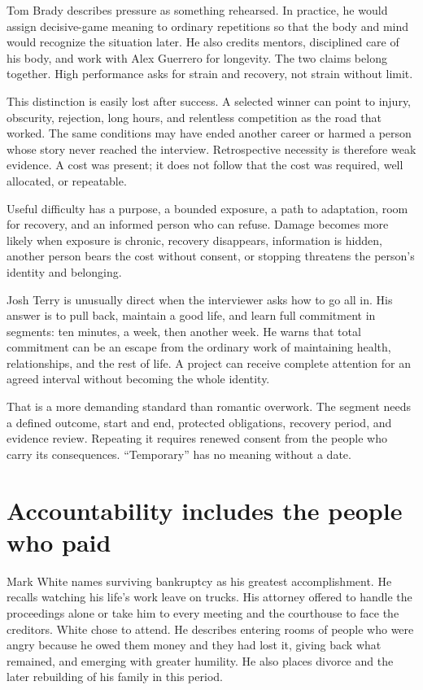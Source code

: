 Tom Brady describes pressure as something rehearsed. In practice, he would
assign decisive-game meaning to ordinary repetitions so that the body and mind
would recognize the situation later. He also credits mentors, disciplined
care of his body, and work with Alex Guerrero for longevity. The two claims
belong together. High performance asks for strain and recovery, not strain
without limit.

This distinction is easily lost after success. A selected winner can point to
injury, obscurity, rejection, long hours, and relentless competition as the
road that worked. The same conditions may have ended another career or harmed
a person whose story never reached the interview. Retrospective necessity is
therefore weak evidence. A cost was present; it does not follow that the cost
was required, well allocated, or repeatable.

Useful difficulty has a purpose, a bounded exposure, a path to adaptation,
room for recovery, and an informed person who can refuse. Damage becomes more
likely when exposure is chronic, recovery disappears, information is hidden,
another person bears the cost without consent, or stopping threatens the
person's identity and belonging.

Josh Terry is unusually direct when the interviewer asks how to go all in. His
answer is to pull back, maintain a good life, and learn full commitment in
segments: ten minutes, a week, then another week. He warns that total
commitment can be an escape from the ordinary work of maintaining health,
relationships, and the rest of life. A project can receive complete attention
for an agreed interval without becoming the whole identity.

That is a more demanding standard than romantic overwork. The segment needs a
defined outcome, start and end, protected obligations, recovery period, and
evidence review. Repeating it requires renewed consent from the people who
carry its consequences. “Temporary” has no meaning without a date.

\section{Accountability includes the people who paid}

Mark White names surviving bankruptcy as his greatest accomplishment. He
recalls watching his life's work leave on trucks. His attorney offered to
handle the proceedings alone or take him to every meeting and the courthouse
to face the creditors. White chose to attend. He describes entering rooms of
people who were angry because he owed them money and they had lost it, giving
back what remained, and emerging with greater humility. He also places divorce
and the later rebuilding of his family in this period.


